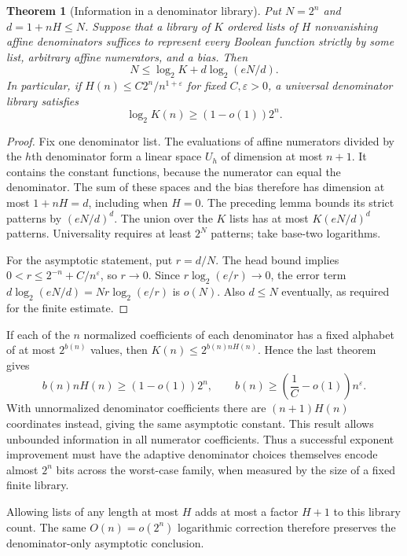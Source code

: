 \documentclass[11pt]{article}
\newtheorem{theorem}{Theorem}
\begin{document}
\begin{theorem}[Information in a denominator library]
Put $N=2^n$ and $d=1+nH\le N$. Suppose that a library of $K$
ordered lists of $H$ nonvanishing affine denominators suffices to
represent every Boolean function strictly by some list, arbitrary
affine numerators, and a bias. Then
\[
 N\le \log_2 K+d\log_2(eN/d).
\]
In particular, if $H(n)\le C2^n/n^{1+\varepsilon}$ for fixed
$C,\varepsilon>0$, a universal denominator library satisfies
\[
 \log_2 K(n)\ge (1-o(1))2^n.
\]
\end{theorem}
\begin{proof}
Fix one denominator list. The evaluations of affine numerators divided
by the $h$th denominator form a linear space $U_h$ of dimension at
most $n+1$. It contains the constant functions, because the numerator
can equal the denominator. The sum of these spaces and the bias
therefore has dimension at most $1+nH=d$, including when $H=0$.
The preceding lemma bounds its strict patterns by $(eN/d)^d$.
The union over the $K$ lists has at most $K(eN/d)^d$ patterns.
Universality requires at least $2^N$ patterns; take base-two logarithms.

For the asymptotic statement, put $r=d/N$. The head bound implies
$0<r\le 2^{-n}+C/n^\varepsilon$, so $r\to0$. Since
$r\log_2(e/r)\to0$, the error term
$d\log_2(eN/d)=Nr\log_2(e/r)$ is $o(N)$. Also $d\le N$
eventually, as required for the finite estimate.
\end{proof}

If each of the $n$ normalized coefficients of each denominator has
a fixed alphabet of at most $2^{b(n)}$ values, then
$K(n)\le 2^{b(n)nH(n)}$. Hence the last theorem gives
\[
 b(n)nH(n)\ge(1-o(1))2^n,\qquad
 b(n)\ge\left(\frac1C-o(1)\right)n^\varepsilon.
\]
With unnormalized denominator coefficients there are $(n+1)H(n)$
coordinates instead, giving the same asymptotic constant. This result
allows unbounded information in all numerator coefficients. Thus a
successful exponent improvement must have the adaptive denominator
choices themselves encode almost $2^n$ bits across the worst-case
family, when measured by the size of a fixed finite library.

Allowing lists of any length at most $H$ adds at most a factor $H+1$
to this library count. The same $O(n)=o(2^n)$ logarithmic correction
therefore preserves the denominator-only asymptotic conclusion.
\end{document}
